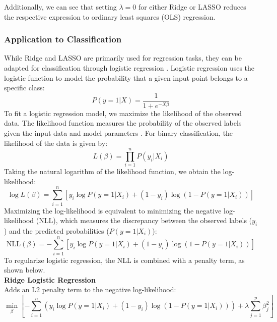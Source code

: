 \documentclass[english,11pt,a4paper,titlepage]{article}
\begin{document}
	Additionally, we can see that setting \( \lambda = 0 \) for either Ridge or LASSO reduces the respective expression to ordinary least squares (OLS) regression.
	
	\subsubsection*{Application to Classification}
	While Ridge and LASSO are primarily used for regression tasks, they can be adapted for classification through logistic regression \cite{friedmanRegularizationPathsGeneralized2010,hastieElementsStatisticalLearning2009}. Logistic regression uses the logistic function to model the probability that a given input point belongs to a specific class:
	\begin{equation*}
		P(y=1|X) = \frac{1}{1 + e^{-X\beta}}
	\end{equation*}
	To fit a logistic regression model, we maximize the likelihood of the observed data. The likelihood function measures the probability of the observed labels given the input data and model parameters \cite{whitlockAnalysisBiologicalData2015}. For binary classification, the likelihood of the data is given by:
	\begin{equation*}
		L(\beta) = \prod_{i=1}^{n} P(y_i | X_i)
	\end{equation*}
	Taking the natural logarithm of the likelihood function, we obtain the log-likelihood:
	\begin{equation*}
		\log L(\beta) = \sum_{i=1}^{n} \left[ y_i \log P(y=1|X_i) + (1-y_i) \log (1 - P(y=1|X_i)) \right]
	\end{equation*}
	Maximizing the log-likelihood is equivalent to minimizing the negative log-likelihood (NLL), which measures the discrepancy between the observed labels (\( y_i \)) and the predicted probabilities (\( P(y = 1 | X_i )\)):
	\begin{equation*}
		\text{NLL}(\beta) = -\sum_{i=1}^{n} \left[ y_i \log P(y=1|X_i) + (1-y_i) \log (1 - P(y=1|X_i)) \right]
	\end{equation*}
	To regularize logistic regression, the NLL is combined with a penalty term, as shown below.\\
	
	\noindent
	\textbf{Ridge Logistic Regression} \\
	Adds an L2 penalty term to the negative log-likelihood:
	\begin{equation*}
		\min_{\beta} \left[ -\sum_{i=1}^{n} \left( y_i \log P(y=1|X_i) + (1-y_i) \log (1 - P(y=1|X_i)) \right) + \lambda \sum_{j=1}^{p}\beta_{j}^{2} \right]
	\end{equation*}
	
\end{document}
